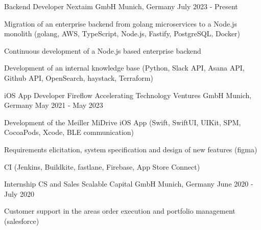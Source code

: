 


\begin{cventries}


\cventry
{Backend Developer} %
{Nextaim GmbH} %
{Munich, Germany} %
{July 2023 - Present} %
{ %
\begin{cvitems}
\item {Migration of an enterprise backend from golang microservices to a Node.js monolith (golang, AWS, TypeScript, Node.js, Fastify, PostgreSQL, Docker)}
\item {Continuous development of a Node.js based enterprise backend}
\item {Development of an internal knowledge base (Python, Slack API, Asana API, Github API, OpenSearch, haystack, Terraform)}
\end{cvitems}
}


\cventry
{iOS App Developer} %
{Fireflow Accelerating Technology Ventures GmbH} %
{Munich, Germany} %
{May 2021 - May 2023} %
{ %
\begin{cvitems}
\item {Development of the Meiller MiDrive iOS App (Swift, SwiftUI, UIKit, SPM, CocoaPods, Xcode, BLE communication)}
\item {Requirements elicitation, system specification and design of new features (figma)}
\item {CI (Jenkins, Buildkite, fastlane, Firebase, App Store Connect)}
\end{cvitems}
}


\cventry
{Internship CS and Sales} %
{Scalable Capital GmbH} %
{Munich, Germany} %
{June 2020 - July 2020} %
{ %
\begin{cvitems}
\item {Customer support in the areas order execution and portfolio management (salesforce)}
\end{cvitems}
}


\end{cventries}
